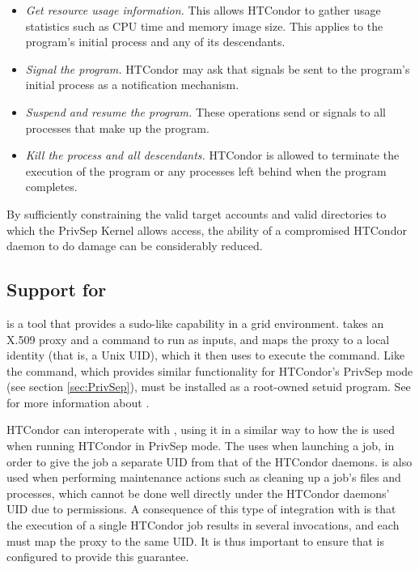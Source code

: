 \begin{itemize}

\item \emph{Get resource usage information.} This allows HTCondor to
gather usage statistics such as CPU time and memory image size. This
applies to the program's initial process and any of its descendants.

\item \emph{Signal the program.} HTCondor may ask that signals be sent
to the program's initial process as a notification mechanism.

\item \emph{Suspend and resume the program.} These operations send
 or  signals to all processes that make up
the program.

\item \emph{Kill the process and all descendants.} HTCondor is allowed
to terminate the execution of the program or any processes
left behind when the program completes.

\end{itemize}

By sufficiently constraining the valid target
accounts and valid directories to which the PrivSep Kernel allows
access, the ability of a compromised HTCondor daemon to do damage can
be considerably reduced.

\subsection{\label{sec:glexec}Support for }

 is a tool that provides a sudo-like capability in a grid
environment. 
 takes an X.509 proxy and a command to run as
inputs,
and maps the proxy to a local identity (that is, a Unix UID),
which it then uses to execute the command.
Like the  command,
which provides similar functionality for HTCondor's PrivSep mode
(see section \ref{sec:PrivSep}),  must be installed as a root-owned
setuid program. See 
for more information about .

HTCondor can interoperate with , using it in a similar way
to how the  is used when running HTCondor in
PrivSep mode. The  uses  when launching
a job, in order to give the job a separate UID from that of the HTCondor daemons.
 is also used when performing maintenance actions such as
cleaning up a job's files and processes, which cannot be done well
directly under the HTCondor daemons' UID due to permissions.
A consequence
of this type of integration with  is that the execution
of a single HTCondor job results in several  invocations, and
each must map the proxy to the same UID.
It is thus important to ensure
that  is configured to provide this guarantee.

